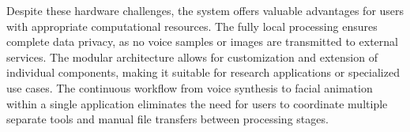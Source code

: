 Despite these hardware challenges, the system offers valuable advantages for users with appropriate
computational resources. The fully local processing ensures complete data privacy, as no voice
samples or images are transmitted to external services. The modular architecture allows for
customization and extension of individual components, making it suitable for research applications
or specialized use cases. The continuous workflow from voice synthesis to facial animation within a
single application eliminates the need for users to coordinate multiple separate tools and manual
file transfers between processing stages.
